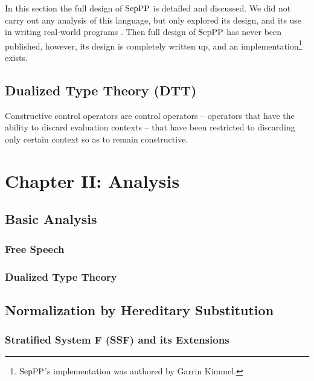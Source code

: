 In this section the full design of $\text{SepPP}$ is detailed and discussed.
We did not carry out any analysis of this language, but only explored
its design, and its use in writing real-world programs
\cite{Kimmel:2013,Kimmel:2012}.  Then full design of $\text{SepPP}$ has never
been published, however, its design is completely written up, and
an implementation\footnote{$\text{SepPP}$'s implementation was authored by
  Garrin Kimmel.}  exists.

\subsection{Dualized Type Theory (DTT)}
\label{subsec:dualized_type_theory}
Constructive control operators are control operators -- operators that
have the ability to discard evaluation contexts -- that have been
restricted to discarding only certain context so as to remain
constructive.


\section{Chapter II: Analysis}
\label{sec:analysis}

\subsection{Basic Analysis}
\label{subsec:basic_analysis}
\subsubsection{Free Speech}
\label{subsubsec:free_speech}


\subsubsection{Dualized Type Theory}
\label{subsubsec:dtt}


\subsection{Normalization by Hereditary Substitution}
\label{subsec:normalization_by_hereditary_substitution}
\subsubsection{Stratified System F (SSF) and its Extensions}
\label{subsec:stratified_system_f_ext}

